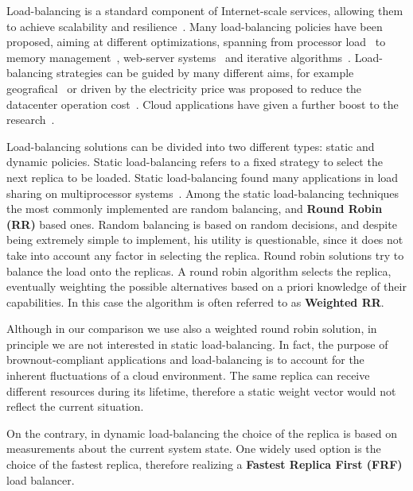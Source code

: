 Load-balancing is a standard component of Internet-scale services,
allowing them to achieve scalability and
resilience~\citep{Barroso09,Hamilton07:LISA,clusteredbalancing}.  Many
load-balancing policies have been proposed, aiming at different
optimizations, spanning from processor load~\cite{Stankovic:TC} to
memory management~\cite{PattersonMemoryLB,MemoryLBACC}, web-server
systems~\cite{Cardellini2003} and iterative 
algorithms~\cite{BahiIterative}. Load-balancing strategies can be 
guided by many different aims, for example
geografical~\cite{GeograficalSASO,geographicalwanbalancing} or driven
by the electricity price was proposed to reduce the datacenter
operation cost~\cite{LoadBalancingForElectricity:TCC}. Cloud
applications have given a further boost to the
research~\citep{Barroso09,Lu11:PerfEval,Lin12:IGCC}.


Load-balancing solutions can be divided into two different types:
static and dynamic policies. Static load-balancing refers to a fixed
strategy to select the next replica to be loaded. Static
load-balancing found many applications in load sharing on
multiprocessor
systems~\cite{StaticLoadBalancing:TSE,StaticOptimal:ACM}. Among the
static load-balancing techniques the most commonly implemented are
random balancing, and \textbf{Round Robin (RR)} based ones. Random
balancing is based on random decisions, and despite being extremely
simple to implement, his utility is questionable, since it does not
take into account any factor in selecting the replica. Round robin
solutions try to balance the load onto the replicas. A round robin
algorithm selects the replica, eventually weighting the possible
alternatives based on a priori knowledge of their capabilities. In
this case the algorithm is often referred to as \textbf{Weighted RR}.

Although in our comparison we use also a weighted round robin
solution, in principle we are not interested in static
load-balancing. In fact, the purpose of brownout-compliant
applications and load-balancing is to account for the inherent
fluctuations of a cloud environment. The same replica can receive
different resources during its lifetime, therefore a static weight
vector would not reflect the current situation.

On the contrary, in dynamic load-balancing the choice of the replica
is based on measurements about the current system state. One widely
used option is the choice of the fastest replica, therefore realizing
a \textbf{Fastest Replica First (FRF)} load balancer.

